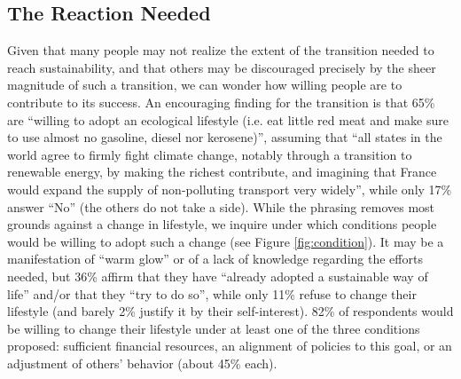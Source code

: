 \documentclass[english,5p,authoryear]{elsarticle}
\begin{document}
    \subsection{The Reaction Needed\label{subsec:reaction}}
Given that many people may not realize the extent of the transition needed to reach sustainability, and that others may be discouraged precisely by the sheer magnitude of such a transition, we can wonder how willing people are to contribute to its success. An encouraging finding for the transition is that 65\% are ``willing to adopt an ecological lifestyle (i.e. eat little red meat and make sure to use almost no gasoline, diesel nor kerosene)'', assuming that ``all states in the world agree to firmly fight climate change, notably through a transition to renewable energy, by making the richest contribute, and imagining that France would expand the supply of non-polluting transport very widely'', while only 17\% answer ``No'' (the others do not take a side). While the phrasing removes most grounds against a change in lifestyle, we inquire under which conditions people would be willing to adopt such a change (see Figure \ref{fig:condition}). It may be a manifestation of ``warm glow'' or of a lack of knowledge regarding the efforts needed, but 36\% affirm that they have ``already adopted a sustainable way of life'' and/or that they ``try to do so'', while only 11\% refuse to change their lifestyle (and barely 2\% justify it by their self-interest). 82\% of respondents would be willing to change their lifestyle under at least one of the three conditions proposed: sufficient financial resources, an alignment of policies to this goal, or an adjustment of others' behavior (about 45\% each).
\end{document}
